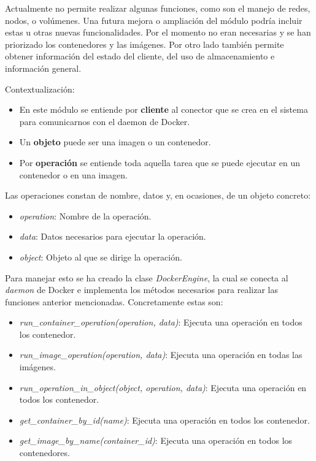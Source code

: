 \bigskip
Actualmente no permite realizar algunas funciones, como son el manejo de redes, nodos, o volúmenes. Una futura mejora o ampliación del módulo podría incluir estas u otras nuevas funcionalidades. Por el momento no eran necesarias y se han priorizado los contenedores y las imágenes. Por otro lado también permite obtener información del estado del cliente, del uso de almacenamiento e información general.

\bigskip
Contextualización:
\begin{itemize}
	\item En este módulo se entiende por \textbf{cliente} al conector que se crea en el sistema para comunicarnos con el daemon de Docker.
	\item Un \textbf{objeto} puede ser una imagen o un contenedor.
	\item Por \textbf{operación} se entiende toda aquella tarea que se puede ejecutar en un contenedor o en una imagen.
\end{itemize}

\bigskip
Las operaciones constan de nombre, datos y, en ocasiones, de un objeto concreto:
\begin{itemize}
	\item \textit{operation}: Nombre de la operación.
	\item \textit{data}: Datos necesarios para ejecutar la operación.
	\item \textit{object}: Objeto al que se dirige la operación.
\end{itemize}


\bigskip
Para manejar esto se ha creado la clase \textit{DockerEngine}, la cual se conecta al \textit{daemon} de Docker e implementa los métodos necesarios para realizar las funciones anterior mencionadas. Concretamente estas son:
\begin{itemize}
	\item \textit{run\_container\_operation(operation, data)}: Ejecuta una operación en todos los contenedor.
	\item \textit{run\_image\_operation(operation, data)}: Ejecuta una operación en todas las imágenes.
	\item \textit{run\_operation\_in\_object(object, operation, data)}: Ejecuta una operación en todos los contenedor.
	\item \textit{get\_container\_by\_id(name)}: Ejecuta una operación en todos los contenedor.
	\item \textit{get\_image\_by\_name(container\_id)}: Ejecuta una operación en todos los contenedores.
\end{itemize}



